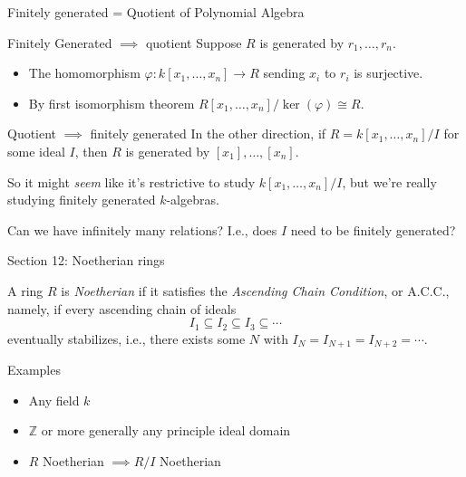 \documentclass{beamer}
\newcommand{\Z}{\mathbb{Z}}
\begin{document}
  \begin{frame}{Finitely generated = Quotient of Polynomial Algebra}
\begin{block}{Finitely Generated $\implies$ quotient}
    Suppose $R$ is generated by $r_1,\dots, r_n$.  
    \begin{itemize}
\item The homomorphism $\varphi:k[x_1,\dots, x_n]\to R$ sending $x_i$ to $r_i$ is surjective.
\item By first isomorphism theorem $R[x_1,\dots, x_n]/\ker(\varphi)\cong R$.
    \end{itemize}
\end{block}
\begin{block}{Quotient $\implies$ finitely generated}
In the other direction, if $R=k[x_1,\dots, x_n]/I$ for some ideal $I$, then $R$ is generated by $[x_1],\dots, [x_n]$.
\end{block}
So it might \emph{seem} like it's restrictive to study $k[x_1,\dots, x_n]/I$, but we're really studying finitely generated $k$-algebras.
\begin{block}{Can we have infinitely many relations?}
I.e., does $I$ need to be finitely generated?
\end{block}
  \end{frame}
  \begin{frame}{Section 12: Noetherian rings}
    \begin{definition}A ring $R$ is \emph{Noetherian} if it satisfies the \emph{Ascending Chain Condition}, or A.C.C., namely, if every ascending chain of ideals $$I_1\subseteq I_2\subseteq I_3\subseteq\cdots$$
      eventually stabilizes, i.e., there exists some $N$ with $I_N=I_{N+1}=I_{N+2}=\cdots$.
    \end{definition} 
    \begin{block}{Examples}
      \begin{itemize}
      \item Any field $k$
      \item $\Z$ or more generally any principle ideal domain
      \item $R$ Noetherian $\implies R/I$ Noetherian
        \end{itemize}
      \end{block}

  
    \end{frame}
\end{document}
